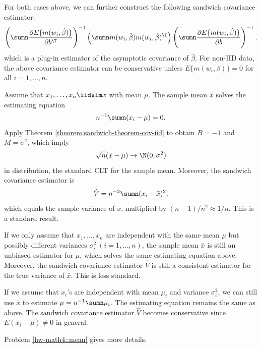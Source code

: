 For both cases above, we can further construct the following sandwich covariance estimator:
$$
\left( \sumn  
 \frac{\partial E \{ m(w_i, \hat\beta) \} }{\partial b^{\T}}  \right)^{-1} 
 \left( \sumn  m(w_{i},  \hat\beta) m(w_{i},  \hat\beta)^{\T}  \right)
  \left( \sumn  
 \frac{\partial E\{ m(w_i,  \hat\beta) \} }{\partial b}  \right)^{-1}  ,
$$
which is a plug-in estimator of the asymptotic covariance of $\hat{\beta}$. 
For non-IID data, the above covariance estimator can be conservative unless $ E\{ m(w_i, \beta) \}  = 0$ for all $i=1, \ldots, n$. 



\begin{example}
\label{eg::sample-variance}
Assume that $x_1,\ldots, x_n \iidsim x$ with mean $\mu$. The sample mean $\bar{x}$ solves the estimating equation
$$
n^{-1} \sumn (x_i -  \mu) = 0.
$$
Apply Theorem \ref{theorem:sandwich-theorem-cov-iid} to obtain $B = -1$ and $M = \sigma^2$, which imply
$$
\sqrt{n} (\bar{x}  -\mu   ) \rightarrow  \N( 0, \sigma^2)
$$
in distribution, the standard CLT for the sample mean. Moreover, the sandwich covariance estimator is
$$
\hat{V}  = 
n^{-2} \sumn ( x_i -  \bar{x}  )^2 ,
$$
which equals the sample variance of $x$, multiplied by $(n-1)/n^2 \approx 1/n$. This is a standard result. 

If we only assume that $x_1,\ldots, x_n$ are independent with the same mean $\mu$ but possibly different variances $\sigma_i^2\ (i=1,\ldots, n)$, the sample mean $\bar{x}$ is still an unbiased estimator for $\mu$, which solves the same estimating equation above. Moreover, the sandwich covariance estimator $\hat{V} $ is still a consistent estimator for the true variance of $\bar{x}$. This is less standard. 


If we assume that $x_i$'s are independent with  mean $\mu_i$ and variance $\sigma_i^2$, we can still use $\bar{x}$ to estimate $\mu = n^{-1} \sumn \mu_i $. The estimating equation remains the same as above. The sandwich covariance estimator $\hat{V}$ becomes conservative since $E(x_i - \mu) \neq 0$ in general. 

Problem \ref{hw-math4::mean} gives more details.
\end{example}



